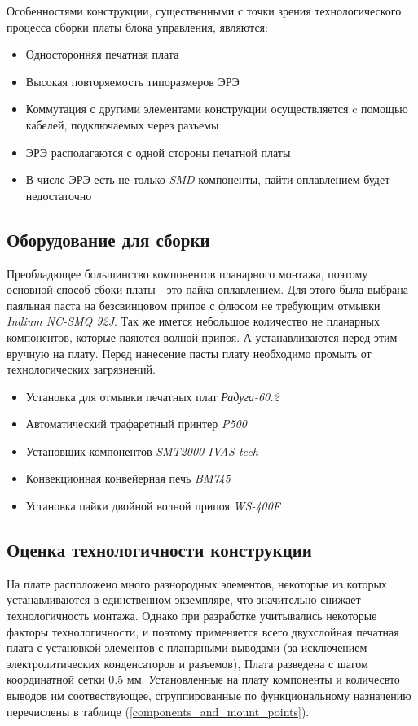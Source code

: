 \documentclass{article}
\begin{document}
Особенностями конструкции, существенными с точки зрения технологического
процесса сборки платы блока управления, являются:

\begin{itemize}
    \item Односторонняя печатная плата
    \item Высокая повторяемость типоразмеров ЭРЭ
    \item Коммутация с другими элементами конструкции осуществляется c помощью
    кабелей, подключаемых через разъемы
    \item ЭРЭ располагаются с одной стороны печатной платы
    \item В числе ЭРЭ есть не только \textit{SMD} компоненты,
    пайти оплавлением будет недостаточно
\end{itemize}

\subsection{Оборудование для сборки}
Преобладющее большинство компонентов планарного монтажа, поэтому основной способ
сбоки платы - это пайка оплавлением. Для этого была выбрана паяльная паста
на безсвинцовом припое с флюсом не требующим отмывки \textit{Indium NC-SMQ 92J}.
Так же имется небольшое количество не планарных компонентов, которые паяются
волной припоя. А устанавливаются перед этим вручную на плату.
Перед нанесение пасты плату необходимо промыть от технологических загрязнений.

\begin{itemize}
    \item Установка для отмывки печатных плат \textit{Радуга-60.2}
    \item Автоматический трафаретный принтер \textit{P500}
    \item Установщик компонентов \textit{SMT2000 IVAS tech}
    \item Конвекционная конвейерная печь \textit{BM745}
    \item Установка пайки двойной волной припоя \textit{WS-400F}
\end{itemize}

\subsection{Оценка технологичности конструкции}
На плате расположено много разнородных элементов, некоторые из которых
устанавливаются в единственном экземпляре, что значительно снижает технологичность
монтажа. Однако при разработке учитывались некоторые факторы технологичности, и
поэтому применяется всего двухслойная печатная плата с установкой элементов с
планарными выводами (за исключением электролитических конденсаторов и разъемов),
Плата разведена с шагом координатной сетки 0.5 мм.
Установленные на плату компоненты и количесвто выводов им соотвествующее,
сгруппированные по функциональному назначению перечислены в таблице
(\ref{components_and_mount_points}).
\end{document}
